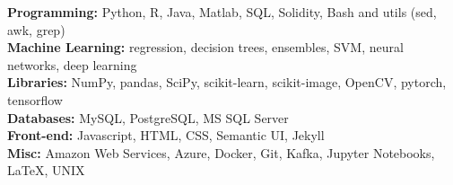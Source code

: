\documentclass[margin,line]{resume}
\begin{document}
\begin{resume}
    \textbf{Programming:} Python, R, Java, Matlab, SQL, Solidity,  Bash and utils (sed, awk, grep) \\
    \textbf{Machine Learning:} regression, decision trees, ensembles, SVM, neural networks, deep learning \\
    \textbf{Libraries:} NumPy, pandas, SciPy, scikit-learn, scikit-image, OpenCV, pytorch, tensorflow \\
    \textbf{Databases:} MySQL, PostgreSQL, MS SQL Server\\
    \textbf{Front-end:} Javascript, HTML, CSS, Semantic UI, Jekyll \\
    \textbf{Misc:} Amazon Web Services, Azure, Docker, Git, Kafka, Jupyter Notebooks, \LaTeX, UNIX

\end{resume}
\end{document}
